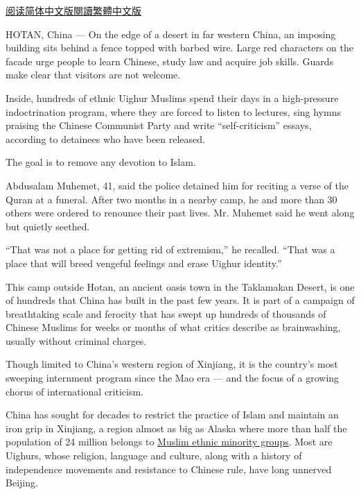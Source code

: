 \href{https://cn.nytimes3xbfgragh.onion/china/20180908/china-builds-a-vast-network-of-detention-camps-to-transform-muslims/}{阅读简体中文版}\href{https://cn.nytimes3xbfgragh.onion/china/20180908/china-builds-a-vast-network-of-detention-camps-to-transform-muslims/zh-hant/}{閱讀繁體中文版}

HOTAN, China --- On the edge of a desert in far western China, an
imposing building sits behind a fence topped with barbed wire. Large red
characters on the facade urge people to learn Chinese, study law and
acquire job skills. Guards make clear that visitors are not welcome.

Inside, hundreds of ethnic Uighur Muslims spend their days in a
high-pressure indoctrination program, where they are forced to listen to
lectures, sing hymns praising the Chinese Communist Party and write
``self-criticism'' essays, according to detainees who have been
released.

The goal is to remove any devotion to Islam.

Abdusalam Muhemet, 41, said the police detained him for reciting a verse
of the Quran at a funeral. After two months in a nearby camp, he and
more than 30 others were ordered to renounce their past lives. Mr.
Muhemet said he went along but quietly seethed.

``That was not a place for getting rid of extremism,'' he recalled.
``That was a place that will breed vengeful feelings and erase Uighur
identity.''

This camp outside Hotan, an ancient oasis town in the Taklamakan Desert,
is one of hundreds that China has built in the past few years. It is
part of a campaign of breathtaking scale and ferocity that has swept up
hundreds of thousands of Chinese Muslims for weeks or months of what
critics describe as brainwashing, usually without criminal charges.

Though limited to China's western region of Xinjiang, it is the
country's most sweeping internment program since the Mao era --- and the
focus of a growing chorus of international criticism.

China has sought for decades to restrict the practice of Islam and
maintain an iron grip in Xinjiang, a region almost as big as Alaska
where more than half the population of 24 million belongs to
\href{http://theasiadialogue.com/2016/03/07/spatial-results-of-the-2010-census-in-xinjiang/}{Muslim
ethnic minority groups}. Most are Uighurs, whose religion, language and
culture, along with a history of independence movements and resistance
to Chinese rule, have long unnerved Beijing.

